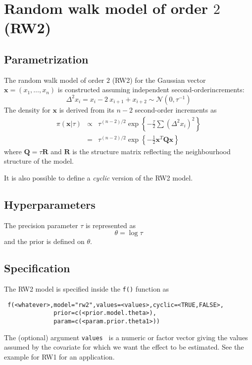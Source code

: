 \documentclass[a4paper,11pt]{article}
\begin{document}
\section*{Random walk model of order $2$ (RW2)}

\subsection*{Parametrization}
The random walk model of order $2$ (RW2) for the Gaussian vector $\mathbf{x}=(x_1,\dots,x_n)$ is constructed assuming independent second-orderincrements:
\[
\Delta^2 x_i = x_i-2\ x_{i+1}+x_{i+2}\sim\mathcal{N}(0,\tau^{-1})
\]
The density for $\mathbf{x}$ is derived from its $n-2$ second-order increments as
\begin{eqnarray}
\pi(\mathbf{x}|\tau) &\propto& \tau^{(n-2)/2} \exp\left\{-\frac{\tau}{2} \sum (\Delta^2 x_i)^2\right\}\\
& = &\tau^{(n-2)/2}\exp\left\{-\frac{1}{2}\mathbf{x}^T\mathbf{Q}\mathbf{x} \right\}
\end{eqnarray}
where $\mathbf{Q}=\tau\mathbf{R}$ and $\mathbf{R}$ is the structure matrix reflecting the neighbourhood structure of the model.

It is also possible to define a {\it cyclic} version of the RW2 model.

\subsection*{Hyperparameters}

The precision parameter $\tau$ is represented as
\begin{displaymath}
    \theta =\log \tau
\end{displaymath}
and the prior is defined on $\theta$. 

\subsection*{Specification}

The RW2 model is specified inside the {\tt f()} function as
\begin{verbatim}
 f(<whatever>,model="rw2",values=<values>,cyclic=<TRUE,FALSE>,
              prior=c(<prior.model.theta>),
              param=c(<param.prior.theta1>))
\end{verbatim}
The (optional) argument {\tt values } is a numeric or factor vector giving the values assumed by the covariate for
 which we want the effect to be estimated. See the example for RW1 for an application. 
\end{document}
